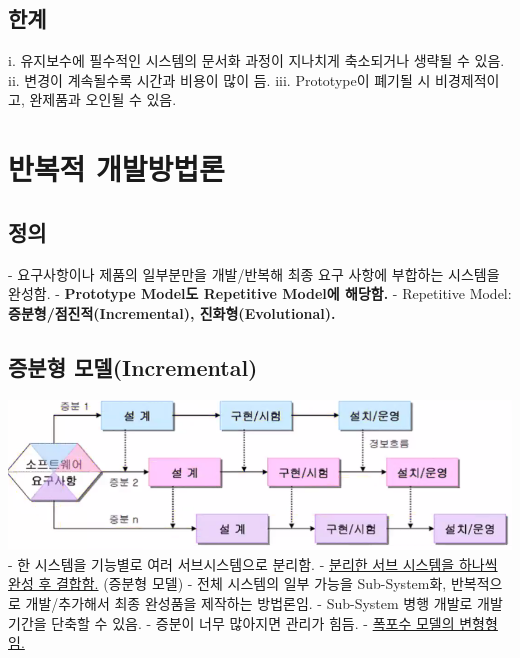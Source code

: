 \documentclass[a4paper,12pt]{article}
\begin{document}
\subsection{한계}
i. 유지보수에 필수적인 시스템의 문서화 과정이 지나치게 축소되거나 생략될 수 있음.
\newline
ii. 변경이 계속될수록 시간과 비용이 많이 듬.
\newline
iii. Prototype이 폐기될 시 비경제적이고, 완제품과 오인될 수 있음.



\newpage
\section{반복적 개발방법론}

\subsection{정의}
- 요구사항이나 제품의 일부분만을 개발/반복해 최종 요구 사항에 부합하는 시스템을 완성함.
\newline
- \textbf{Prototype Model도 Repetitive Model에 해당함.}
\newline
- Repetitive Model: \textbf{증분형/점진적(Incremental), 진화형(Evolutional).}
\newline

\subsection{증분형 모델(Incremental)}

\includegraphics[scale=0.6]{51}
\newline
- 한 시스템을 기능별로 여러 서브시스템으로 분리함.
\newline
- \underline{분리한 서브 시스템을 하나씩 완성 후 결합함.} (증분형 모델)
\newline
- 전체 시스템의 일부 가능을 Sub-System화, 반복적으로 개발/추가해서 최종 완성품을 제작하는 방법론임.
\newline
- Sub-System 병행 개발로 개발 기간을 단축할 수 있음.
\newline
- 증분이 너무 많아지면 관리가 힘듬.
\newline
- \underline{폭포수 모델의 변형형임.}
\end{document}
